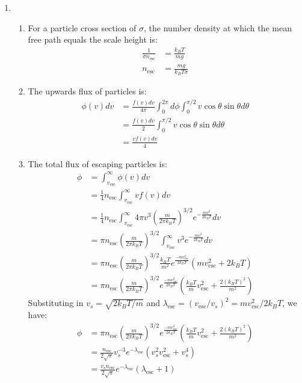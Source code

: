\documentclass[11pt]{article}
\begin{document}
\begin{enumerate}
\item 
    \begin{enumerate}
    \item For a particle cross section of $\sigma$, the number density at which the mean free path equals the scale height is:
        \begin{align}
        \frac{1}{\sigma n_\mathrm{esc}} &= \frac{k_BT}{mg} \\
        n_\mathrm{esc} &= \frac{mg}{k_BT\sigma}
        \end{align}
    
    \item The upwards flux of particles is:
        \begin{align}
        \phi(v)dv &= \frac{f(v)dv}{4\pi} \int_0^{2\pi}d\phi \int_0^{\pi/2} v\cos\theta\sin\theta d\theta \\
        &= \frac{f(v)dv}{2} \int_0^{\pi/2} v\cos\theta\sin\theta d\theta \\
        &= \frac{vf(v)dv}{4}
        \end{align}
        
    \item The total flux of escaping particles is:
    	\begin{align}
		\phi &= \int_{v_\mathrm{esc}}^\infty \phi(v)dv \\
		&= \frac{1}{4}n_\mathrm{esc}\int_{v_\mathrm{esc}}^\infty vf(v)dv \\
		&= \frac{1}{4}n_\mathrm{esc}\int_{v_\mathrm{esc}}^\infty 4\pi v^3 \left(\frac{m}{2\pi k_B T}\right)^{3/2} e^{-\frac{mv^2}{2k_B T}} dv \\
		&= \pi n_\mathrm{esc} \left(\frac{m}{2\pi k_B T}\right)^{3/2} \int_{v_\mathrm{esc}}^\infty v^3 e^{-\frac{mv^2}{2k_B T}} dv \\
		&= \pi n_\mathrm{esc} \left(\frac{m}{2\pi k_B T}\right)^{3/2} \frac{k_B T}{m^2} e^{\frac{-mv_\mathrm{esc}^2}{2k_BT}} \left(mv_\mathrm{esc}^2 + 2k_B T \right) \\
		&= \pi n_\mathrm{esc} \left(\frac{m}{2\pi k_B T}\right)^{3/2} e^{\frac{-mv_\mathrm{esc}^2}{2k_BT}} \left(\frac{k_BT}{m}v_\mathrm{esc}^2 + \frac{2(k_B T)^2}{m^2} \right)
		\end{align}
		Substituting in $v_s = \sqrt{2k_BT/m}$ and $\lambda_\mathrm{esc} = (v_\mathrm{esc}/v_s)^2 = mv_\mathrm{esc}^2/2k_BT$, we have:
		\begin{align}
		\phi &= \pi n_\mathrm{esc} \left(\frac{m}{2\pi k_B T}\right)^{3/2} e^{\frac{-mv_\mathrm{esc}^2}{2k_BT}} \left(\frac{k_BT}{m}v_\mathrm{esc}^2 + \frac{2(k_B T)^2}{m^2} \right) \\
		&= \frac{n_\mathrm{esc}}{2\sqrt{\pi}} v_s^{-3} e^{-\lambda_\mathrm{esc}} \left(v_s^2v_\mathrm{esc}^2 + v_s^4 \right) \\
		&= \frac{v_s n_\mathrm{esc}}{2\sqrt{\pi}} e^{-\lambda_\mathrm{esc}} \left(\lambda_\mathrm{esc} + 1 \right)
		\end{align}
		

\end{enumerate}
\end{enumerate}
\end{document}
